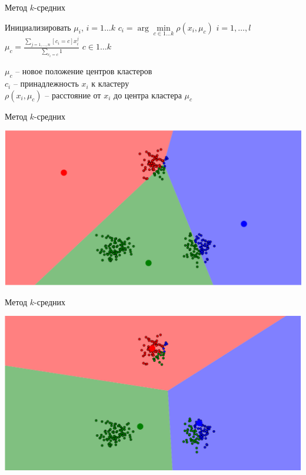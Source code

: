 \documentclass[10pt]{beamer}
\begin{document}
\begin{frame}{Метод $k$-средних}
	\begin{algorithmic}[1]
            \State Инициализировать $\mu_i$, $i = 1 \dots k$
                \State $c_i = \arg\min\limits_{c \in 1\dots k} \rho(x_i, \mu_c)$ \hspace{5mm} $i = 1,\dots, l$\\
                
                \State ${\mu_{c} = \frac{\sum\limits_{j=1,\dots, n} [c_i = c] x_i^j}{\sum\limits_{c_i = c} 1} }$ \hspace{10mm} $c \in 1 \dots k$
             \EndRepeat
        \EndFunction
  \end{algorithmic}    
	\bigbreak
	$\mu_{c}$ -- новое положение центров кластеров\\
	$c_i$ -- принадлежность $x_i$ к кластеру\\
	$\rho(x_i, \mu_c)$ -- расстояние от $x_i$ до центра кластера $\mu_c$
\end{frame}

\begin{frame}{Метод $k$-средних}
	\begin{center}
	  \includegraphics[width= \textwidth, keepaspectratio = true]{images/kmeans1}   
	\end{center}
\end{frame}

\begin{frame}{Метод $k$-средних}
	\begin{center}
	  \includegraphics[width= \textwidth, keepaspectratio = true]{images/kmeans2}   
	\end{center}
\end{frame}
\end{document}

